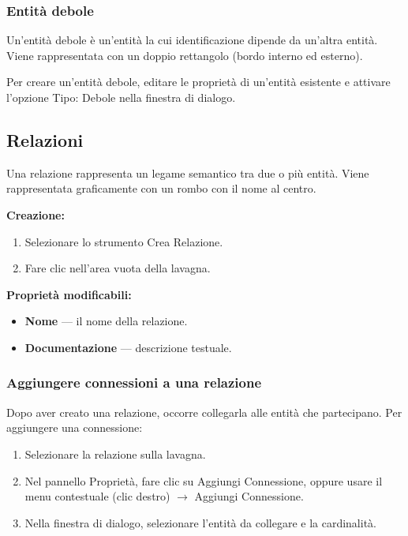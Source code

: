 \documentclass[a4paper,11pt]{article}
\newcommand\mediumweight{\fontseries{mb}\selectfont}
\newcommand\uielement[1]{{\mediumweight #1}}
\begin{document}
\subsubsection{Entità debole}

Un'entità debole è un'entità la cui identificazione dipende da un'altra entità. Viene
rappresentata con un doppio rettangolo (bordo interno ed esterno).

Per creare un'entità debole, editare le proprietà di un'entità esistente e attivare l'opzione
\uielement{Tipo: Debole} nella finestra di dialogo.

\subsection{Relazioni}

Una relazione rappresenta un legame semantico tra due o più entità. Viene rappresentata
graficamente con un rombo con il nome al centro.

\textbf{Creazione:}
\begin{enumerate}
  \item Selezionare lo strumento \uielement{Crea Relazione}.
  \item Fare clic nell'area vuota della lavagna.
\end{enumerate}

\textbf{Proprietà modificabili:}
\begin{itemize}
  \item \textbf{Nome} --- il nome della relazione.
  \item \textbf{Documentazione} --- descrizione testuale.
\end{itemize}

\subsubsection{Aggiungere connessioni a una relazione}

Dopo aver creato una relazione, occorre collegarla alle entità che partecipano. Per aggiungere
una connessione:

\begin{enumerate}
  \item Selezionare la relazione sulla lavagna.
  \item Nel pannello Proprietà, fare clic su \uielement{Aggiungi Connessione}, oppure usare il
        menu contestuale (clic destro) $\to$ \uielement{Aggiungi Connessione}.
  \item Nella finestra di dialogo, selezionare l'entità da collegare e la cardinalità.
\end{enumerate}
\end{document}

